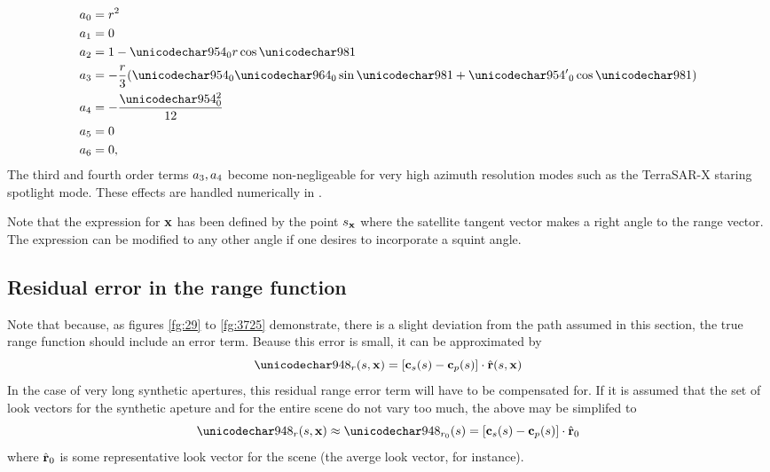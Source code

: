 \begin{align}
 \rcoeff_0 &= \targetrange^{2}\\
 \rcoeff_1 &= 0\\
 \rcoeff_2 &= 1 - \kappa_0\targetrange\cos\targetdepression\\
 \rcoeff_3 &= -\frac{\targetrange}{3}(\kappa_0\tau_0\sin\targetdepression + {\kappa'}_0\cos\targetdepression)\\
 \rcoeff_4 &= -\frac{\kappa_0^2}{12}\\
 \rcoeff_5 &= 0\\
 \rcoeff_6 &= 0,
\end{align}
The third and fourth order terms $a_3,a_4$ become non-negligeable for very high azimuth resolution modes such as the TerraSAR-X staring spotlight mode. These effects are handled numerically in \cite{PratsIraola2014}.
\par
Note that the expression for $\mathbf{\mathbf{x}}$ has been defined by the point $s_{\mathbf{x}}$ where the satellite tangent vector makes a right angle to the range vector. The expression can be modified to any other angle if one desires to incorporate a squint angle.
\subsection*{Residual error in the range function}
Note that because, as figures \ref{fg:29} to \ref{fg:3725} demonstrate, there is a slight deviation from the path assumed in this section, the true range function should include an error term. Beause this error is small, it can be approximated by
\begin{equation}
 \rangeError(\parm, \vct\target) = [\sats(\parm)-\satp(\parm)]\cdot\uRangeVectorParm
\end{equation}
In the case of very long synthetic apertures, this residual range error term will have to be compensated for. If it is assumed that the set of look vectors for the synthetic apeture and for the entire scene do not vary too much, the above may be simplifed to
\begin{equation}
 \rangeError(\parm, \vct\target) \approx \rangeErrorZero(\parm) = [\sats(\parm)-\satp(\parm)]\cdot\uRangeVectorParmZero
\end{equation}
where $\hat{\mathbf{r}}_0$ is some representative look vector for the scene (the averge look vector, for instance).
